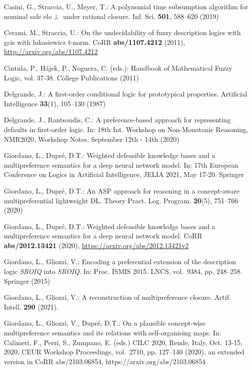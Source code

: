 \documentclass[runningheads]{llncs}
\begin{document}
\begin{thebibliography}{10}
Casini, G., Straccia, U., Meyer, T.: A polynomial time subsumption algorithm
  for nominal safe elo{\(\perp\)} under rational closure. Inf. Sci.
  \textbf{501},  588--620 (2019)

Cerami, M., Straccia, U.: On the undecidability of fuzzy description logics
  with gcis with lukasiewicz t-norm. CoRR  \textbf{abs/1107.4212} (2011),
  \url{http://arxiv.org/abs/1107.4212}

Cintula, P., H\'ajek, P., Noguera, C. (eds.): Handbook of Mathematical Fuzzy
  Logic, vol. 37-38. College Publications (2011)

Delgrande, J.: A first-order conditional logic for prototypical properties.
  Artificial Intelligence  \textbf{33}(1),  105--130 (1987)

Delgrande, J., Rantsoudis, C.: A preference-based approach for representing
  defaults in first-order logic. In: 18th Int. Workshop on Non-Monotonic
  Reasoning, NMR2020, Workshop Notes, September 12th - 14th (2020)

Giordano, L., Dupr{\'{e}}, D.T.: Weighted defeasible knowledge bases and a
  multipreference semantics for a deep neural network model. In: 17th European
  Conference on Logics in Artificial Intelligence, {JELIA 2021}, May 17-20.
  Springer

Giordano, L., Dupr{\'{e}}, D.T.: An {ASP} approach for reasoning in a
  concept-aware multipreferential lightweight {DL}. Theory Pract. Log. Program.
   \textbf{20}(5),  751--766 (2020)

Giordano, L., Dupr{\'{e}}, D.T.: Weighted defeasible knowledge bases and a
  multipreference semantics for a deep neural network model. CoRR
  \textbf{abs/2012.13421} (2020), \url{https://arxiv.org/abs/2012.13421v2}

Giordano, L., Gliozzi, V.: Encoding a preferential extension of the description
  logic \emph{SROIQ} into \emph{SROIQ}. In: Proc. {ISMIS} 2015. LNCS,
  vol.~9384, pp. 248--258. Springer (2015)

Giordano, L., Gliozzi, V.: A reconstruction of multipreference closure. Artif.
  Intell.  \textbf{290} (2021). 

Giordano, L., Gliozzi, V., Dupr{\'{e}}, D.T.: On a plausible concept-wise
  multipreference semantics and its relations with self-organising maps. In:
  Calimeri, F., Perri, S., Zumpano, E. (eds.) {CILC} 2020, Rende, Italy, Oct.
  13-15, 2020. {CEUR} Workshop Proceedings, vol.~2710, pp. 127--140 (2020), an
  extended version in CoRR abs/2103.06854, https://arxiv.org/abs/2103.06854


\end{thebibliography}
\end{document}
